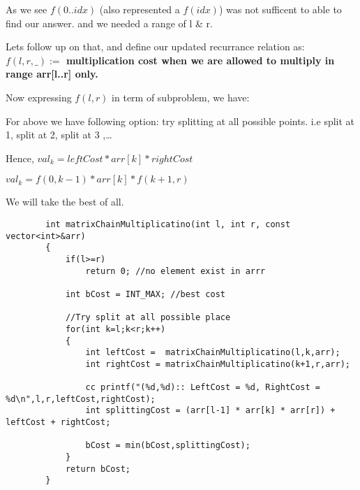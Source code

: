 \vspace{5mm}
\begin{solution}
    
    \obeylines
    As we see $f(0..idx)$ (also represented a $f(idx)$) was not sufficent to able to find our answer.
    and we needed a range of l \& r.

    \medskip
    Lets follow up on that, and define our updated recurrance relation as:
    \textbf{$f(l,r,\_):=$ multiplication cost when we are allowed to multiply in range arr[l..r] \textbf{only}.}

    \bigskip
    Now expressing $f(l,r)$ in term of subproblem, we have:

    For above we have following option:
        try splitting at all possible points.
        i.e split at 1, split at 2, split at 3 ,\dots

        Hence,
        $val_k = leftCost * arr[k] * rightCost$

        $val_k = f(0,k-1) * arr[k] * f(k+1,r)$

        We will take the best of all.

\begin{verbatim}
        int matrixChainMultiplicatino(int l, int r, const vector<int>&arr)
        {
            if(l>=r)
                return 0; //no element exist in arrr

            int bCost = INT_MAX; //best cost

            //Try split at all possible place
            for(int k=l;k<r;k++)
            {
                int leftCost =  matrixChainMultiplicatino(l,k,arr);
                int rightCost = matrixChainMultiplicatino(k+1,r,arr);

                cc printf("(%d,%d):: LeftCost = %d, RightCost = %d\n",l,r,leftCost,rightCost);
                int splittingCost = (arr[l-1] * arr[k] * arr[r]) + leftCost + rightCost;

                bCost = min(bCost,splittingCost);
            }
            return bCost;
        }
\end{verbatim}

\end{solution}